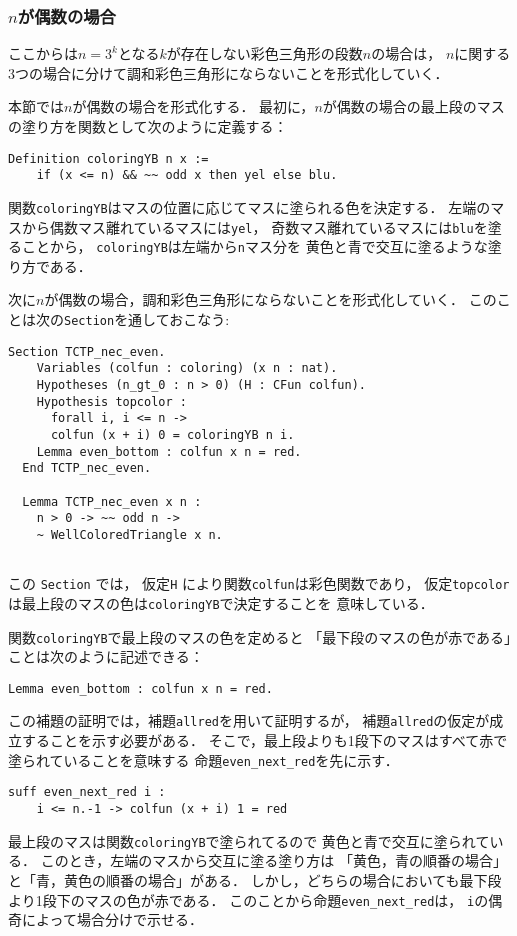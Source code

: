 \subsubsection{$n$が偶数の場合} \label{sec:even}
ここからは$n=3^k$となる$k$が存在しない彩色三角形の段数$n$の場合は，
$n$に関する3つの場合に分けて調和彩色三角形にならないことを形式化していく．

本節では$n$が偶数の場合を形式化する．
最初に，$n$が偶数の場合の最上段のマスの塗り方を関数として次のように定義する：
\begin{lstlisting}[language=Coq]
  Definition coloringYB n x :=
    if (x <= n) && ~~ odd x then yel else blu.
\end{lstlisting}
関数{\tt{coloringYB}}はマスの位置に応じてマスに塗られる色を決定する．
左端のマスから偶数マス離れているマスには{\tt{yel}}，
奇数マス離れているマスには{\tt{blu}}を塗ることから，
{\tt{coloringYB}}は左端から{\tt{n}}マス分を
黄色と青で交互に塗るような塗り方である．

次に$n$が偶数の場合，調和彩色三角形にならないことを形式化していく．
このことは次の{\tt{Section}}を通しておこなう:
\begin{lstlisting}[language=Coq]
  Section TCTP_nec_even.
    Variables (colfun : coloring) (x n : nat).
    Hypotheses (n_gt_0 : n > 0) (H : CFun colfun).
    Hypothesis topcolor :
      forall i, i <= n ->
      colfun (x + i) 0 = coloringYB n i.
    Lemma even_bottom : colfun x n = red.
  End TCTP_nec_even.
    
  Lemma TCTP_nec_even x n :
    n > 0 -> ~~ odd n ->
    ~ WellColoredTriangle x n.
  
\end{lstlisting}
この {\tt{Section}} では，
仮定{\tt{H}} により関数{\tt{colfun}}は彩色関数であり，
仮定{\tt{topcolor}}は最上段のマスの色は{\tt{coloringYB}}で決定することを
意味している．

関数{\tt{coloringYB}}で最上段のマスの色を定めると
「最下段のマスの色が赤である」ことは次のように記述できる：
\begin{lstlisting}[language=Coq]
  Lemma even_bottom : colfun x n = red.
\end{lstlisting}
この補題の証明では，補題{\tt{allred}}を用いて証明するが，
補題{\tt{allred}}の仮定が成立することを示す必要がある．
そこで，最上段よりも1段下のマスはすべて赤で塗られていることを意味する
命題{\tt{even\_next\_red}}を先に示す．
\begin{lstlisting}[language=Coq]
  suff even_next_red i :
    i <= n.-1 -> colfun (x + i) 1 = red
\end{lstlisting}
最上段のマスは関数{\tt{coloringYB}}で塗られてるので
黄色と青で交互に塗られている．
このとき，左端のマスから交互に塗る塗り方は
「黄色，青の順番の場合」と「青，黄色の順番の場合」がある．
しかし，どちらの場合においても最下段より1段下のマスの色が赤である．
このことから命題{\tt{even\_next\_red}}は，
{\tt{i}}の偶奇によって場合分けで示せる．

